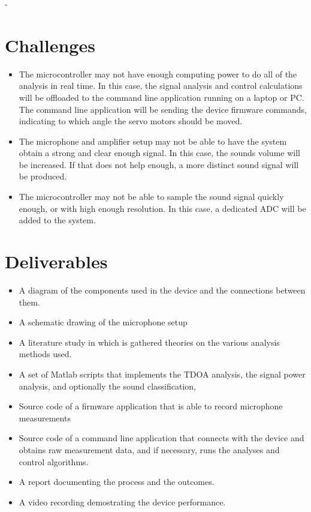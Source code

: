\documentclass[a4paper]{article}
\begin{document}
- 

\section{Challenges}
\begin{itemize}
    \item The microcontroller may not have enough computing power to do all of the analysis in real time. In this case, the signal analysis and control calculations will be offloaded to the command line application running on a laptop or PC. The command line application will be sending the device firmware commands, indicating to which angle the servo motors should be moved.
    \item The microphone and amplifier setup may not be able to have the system obtain a strong and clear enough signal. In this case, the sounds volume will be increased. If that does not help enough, a more distinct sound signal will be produced.
    \item The microcontroller may not be able to sample the sound signal quickly enough, or with high enough resolution. In this case, a dedicated ADC will be added to the system.

\end{itemize}
\section{Deliverables}
\begin{itemize}
    \item A diagram of the components used in the device and the connections between them.
    \item A schematic drawing of the microphone setup
    \item A literature study in which is gathered theories on the various analysis methods used.
    \item A set of Matlab scripts that implements the TDOA analysis, the signal power analysis, and optionally the sound classification,
    \item Source code of a firmware application that is able to record microphone measurements
    \item Source code of a command line application that connects with the device and obtains raw measurement data, and if necessary, runs the analyses and control algorithms.
    \item A report documenting the process and the outcomes.
    \item A video recording demostrating the device performance.
\end{itemize}



\end{document}
